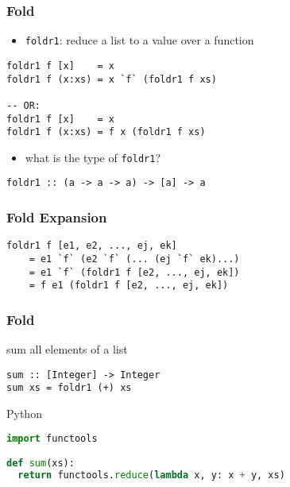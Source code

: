 \documentclass[dvipsnames]{beamer}
\theoremstyle{plain}
\begin{document}
\begin{frame}[fragile]
  \frametitle{Fold}

  \begin{itemize}
    \item \lstinline{foldr1}: reduce a list to a value over a function
  \end{itemize}

  \begin{exampleblock}{}
    \begin{lstlisting}
foldr1 f [x]    = x
foldr1 f (x:xs) = x `f` (foldr1 f xs)

-- OR:
foldr1 f [x]    = x
foldr1 f (x:xs) = f x (foldr1 f xs)
    \end{lstlisting}
  \end{exampleblock}

  \pause
  \begin{itemize}
    \item what is the type of \lstinline{foldr1}?
  \end{itemize}

  \begin{lstlisting}
foldr1 :: (a -> a -> a) -> [a] -> a
  \end{lstlisting}
\end{frame}

\begin{frame}[fragile]
  \frametitle{Fold Expansion}

  \begin{block}{}
    \begin{lstlisting}
foldr1 f [e1, e2, ..., ej, ek]
    = e1 `f` (e2 `f` (... (ej `f` ek)...)
    = e1 `f` (foldr1 f [e2, ..., ej, ek])
    = f e1 (foldr1 f [e2, ..., ej, ek])
    \end{lstlisting}
  \end{block}
\end{frame}

\begin{frame}[fragile]
  \frametitle{Fold}

  \begin{exampleblock}{sum all elements of a list}
    \begin{lstlisting}
sum :: [Integer] -> Integer
sum xs = foldr1 (+) xs
    \end{lstlisting}
  \end{exampleblock}

  \bigskip
  \begin{exampleblock}{Python}
    \begin{lstlisting}[language=python]
import functools

def sum(xs):
  return functools.reduce(lambda x, y: x + y, xs)
    \end{lstlisting}
  \end{exampleblock}
\end{frame}
\end{document}
